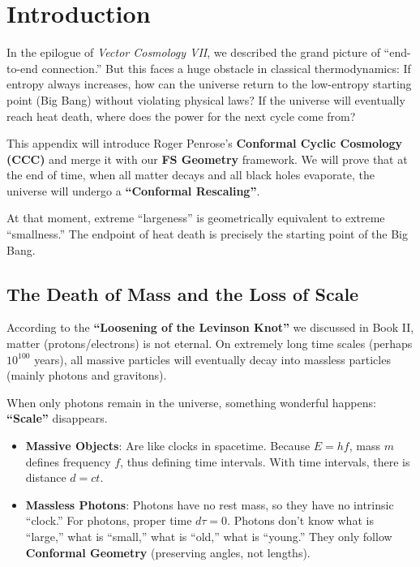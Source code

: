 \section{Introduction}

In the epilogue of \textit{Vector Cosmology VII}, we described the grand picture of ``end-to-end connection.'' But this faces a huge obstacle in classical thermodynamics: If entropy always increases, how can the universe return to the low-entropy starting point (Big Bang) without violating physical laws? If the universe will eventually reach heat death, where does the power for the next cycle come from?

This appendix will introduce Roger Penrose's \textbf{Conformal Cyclic Cosmology (CCC)} and merge it with our \textbf{FS Geometry} framework. We will prove that at the end of time, when all matter decays and all black holes evaporate, the universe will undergo a \textbf{``Conformal Rescaling''}.

At that moment, extreme ``largeness'' is geometrically equivalent to extreme ``smallness.'' The endpoint of heat death is precisely the starting point of the Big Bang.

\subsection{The Death of Mass and the Loss of Scale}

According to the \textbf{``Loosening of the Levinson Knot''} we discussed in Book II, matter (protons/electrons) is not eternal. On extremely long time scales (perhaps $10^{100}$ years), all massive particles will eventually decay into massless particles (mainly photons and gravitons).

When only photons remain in the universe, something wonderful happens: \textbf{``Scale''} disappears.

\begin{itemize}
\item \textbf{Massive Objects}: Are like clocks in spacetime. Because $E=hf$, mass $m$ defines frequency $f$, thus defining time intervals. With time intervals, there is distance $d=ct$.

\item \textbf{Massless Photons}: Photons have no rest mass, so they have no intrinsic ``clock.'' For photons, proper time $d\tau = 0$. Photons don't know what is ``large,'' what is ``small,'' what is ``old,'' what is ``young.'' They only follow \textbf{Conformal Geometry} (preserving angles, not lengths).
\end{itemize}

